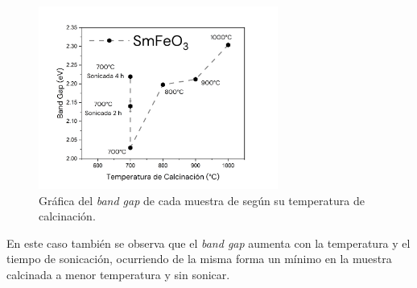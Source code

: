 \documentclass[../main.tex]{subfiles}
\begin{document}
\begin{figure}[H]
    \centering
    \includegraphics[width=0.7\textwidth]{fig/BGSmFeO3.png}
    \caption{Gráfica del \textit{band gap} de cada muestra de \sama{} según su temperatura de calcinación.}
    \label{fig:bandgapvT}
\end{figure}
En este caso también se observa que el \textit{band gap} aumenta con la temperatura y el tiempo de sonicación, ocurriendo de la misma forma un mínimo en la muestra calcinada a menor temperatura y sin sonicar.
\end{document}
